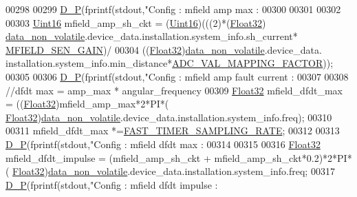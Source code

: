 \begin{DoxyCode}
{00298                                   
00299      \hyperlink{a00040_aaa56ed691cef86e8de0c4e90e47f2e5d}{D\_P}(fprintf(stdout,\textcolor{stringliteral}{"Config : mfield amp max :%
00300      
00301      
00302      
00303      \hyperlink{a00072_a59a9f6be4562c327cbfb4f7e8e18f08b}{Uint16} mfield\_amp\_sh\_ckt   = (\hyperlink{a00072_a59a9f6be4562c327cbfb4f7e8e18f08b}{Uint16})(((2)*(\hyperlink{a00072_a87d38f886e617ced2698fc55afa07637}{Float32})
      \hyperlink{a00060_a76ac5f917f5308dcd83de0d7c94559fb}{data\_non\_volatile}.device\_data.installation.system\_info.sh\_current*
      \hyperlink{a00019_a0dbceb8ab2804359733a52568f2fd349}{MFIELD\_SEN\_GAIN})/
00304                                    ((\hyperlink{a00072_a87d38f886e617ced2698fc55afa07637}{Float32})\hyperlink{a00060_a76ac5f917f5308dcd83de0d7c94559fb}{data\_non\_volatile}.device\_data.
      installation.system\_info.min\_distance*\hyperlink{a00058_ada92d3eeeec0cbeee41e76a52d145792}{ADC\_VAL\_MAPPING\_FACTOR}));
00305                                    
00306      \hyperlink{a00040_aaa56ed691cef86e8de0c4e90e47f2e5d}{D\_P}(fprintf(stdout,\textcolor{stringliteral}{"Config : mfield amp fault current :%
00307 
00308      \textcolor{comment}{//dfdt max = amp\_max * angular\_frequency}
00309      \hyperlink{a00072_a87d38f886e617ced2698fc55afa07637}{Float32} mfield\_dfdt\_max     = ((\hyperlink{a00072_a87d38f886e617ced2698fc55afa07637}{Float32})mfield\_amp\_max*2*PI*(
      \hyperlink{a00072_a87d38f886e617ced2698fc55afa07637}{Float32})\hyperlink{a00060_a76ac5f917f5308dcd83de0d7c94559fb}{data\_non\_volatile}.device\_data.installation.system\_info.freq);
00310 
00311              mfield\_dfdt\_max    *=\hyperlink{a00021_a3a4dcb8af26a561d90607a41a3745806}{FAST\_TIMER\_SAMPLING\_RATE};
00312 
00313      \hyperlink{a00040_aaa56ed691cef86e8de0c4e90e47f2e5d}{D\_P}(fprintf(stdout,\textcolor{stringliteral}{"Config : mfield dfdt max :%
00314 
00315 
00316      \hyperlink{a00072_a87d38f886e617ced2698fc55afa07637}{Float32} mfield\_dfdt\_impulse  = (mfield\_amp\_sh\_ckt + mfield\_amp\_sh\_ckt*0.2)*2*PI*(
      \hyperlink{a00072_a87d38f886e617ced2698fc55afa07637}{Float32})\hyperlink{a00060_a76ac5f917f5308dcd83de0d7c94559fb}{data\_non\_volatile}.device\_data.installation.system\_info.freq;
00317      \hyperlink{a00040_aaa56ed691cef86e8de0c4e90e47f2e5d}{D\_P}(fprintf(stdout,\textcolor{stringliteral}{"Config : mfield dfdt impulse :%
}}}}}
\end{DoxyCode}

